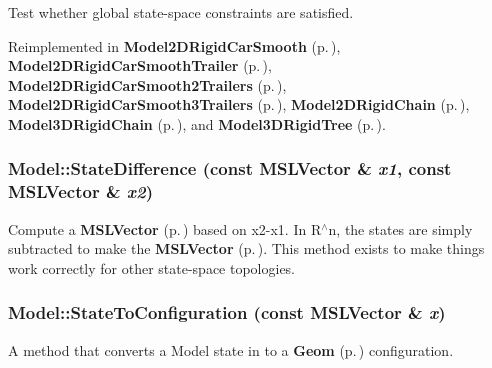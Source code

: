 Test whether global state-space constraints are satisfied.



Reimplemented in {\bf Model2DRigid\-Car\-Smooth} {\rm (p.\,\pageref{class_Model2DRigidCarSmooth_a6})}, {\bf Model2DRigid\-Car\-Smooth\-Trailer} {\rm (p.\,\pageref{class_Model2DRigidCarSmoothTrailer_a5})}, {\bf Model2DRigid\-Car\-Smooth2Trailers} {\rm (p.\,\pageref{class_Model2DRigidCarSmooth2Trailers_a5})}, {\bf Model2DRigid\-Car\-Smooth3Trailers} {\rm (p.\,\pageref{class_Model2DRigidCarSmooth3Trailers_a5})}, {\bf Model2DRigid\-Chain} {\rm (p.\,\pageref{class_Model2DRigidChain_a6})}, {\bf Model3DRigid\-Chain} {\rm (p.\,\pageref{class_Model3DRigidChain_a6})}, and {\bf Model3DRigid\-Tree} {\rm (p.\,\pageref{class_Model3DRigidTree_a6})}.
\subsubsection{ Model::State\-Difference (const {\bf MSLVector} \& {\em x1}, const {\bf MSLVector} \& {\em x2})\hspace{0.3cm}{\tt  [virtual]}}\label{class_Model_a7}


Compute a {\bf MSLVector} {\rm (p.\,\pageref{class_MSLVector})} based on x2-x1. In R$^\wedge$n, the states are simply subtracted to make the {\bf MSLVector} {\rm (p.\,\pageref{class_MSLVector})}. This method exists to make things work correctly for other state-space topologies.

\subsubsection{ Model::State\-To\-Configuration (const {\bf MSLVector} \& {\em x})\hspace{0.3cm}{\tt  [virtual]}}\label{class_Model_a8}


A method that converts a Model state in to a {\bf Geom} {\rm (p.\,\pageref{class_Geom})} configuration.



